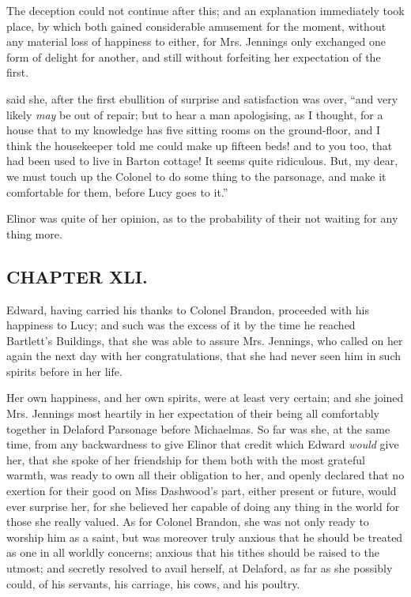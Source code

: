 The deception could not continue after this; and an explanation immediately took place, by which both gained considerable amusement for the moment, without any material loss of happiness to either, for Mrs. Jennings only exchanged one form of delight for another, and still without forfeiting her expectation of the first.

 said she, after the first ebullition of surprise and satisfaction was over, “and very likely {\em may} be out of repair; but to hear a man apologising, as I thought, for a house that to my knowledge has five sitting rooms on the ground-floor, and I think the housekeeper told me could make up fifteen beds! and to you too, that had been used to live in Barton cottage! It seems quite ridiculous. But, my dear, we must touch up the Colonel to do some thing to the parsonage, and make it comfortable for them, before Lucy goes to it.”



Elinor was quite of her opinion, as to the probability of their not waiting for any thing more.

\subsection[chapter-xli.]{\useURL[url41][][][]\from[url41]CHAPTER XLI.}

Edward, having carried his thanks to Colonel Brandon, proceeded with his happiness to Lucy; and such was the excess of it by the time he reached Bartlett's Buildings, that she was able to assure Mrs. Jennings, who called on her again the next day with her congratulations, that she had never seen him in such spirits before in her life.

Her own happiness, and her own spirits, were at least very certain; and she joined Mrs. Jennings most heartily in her expectation of their being all comfortably together in Delaford Parsonage before Michaelmas. So far was she, at the same time, from any backwardness to give Elinor that credit which Edward {\em would} give her, that she spoke of her friendship for them both with the most grateful warmth, was ready to own all their obligation to her, and openly declared that no exertion for their good on Miss Dashwood's part, either present or future, would ever surprise her, for she believed her capable of doing any thing in the world for those she really valued. As for Colonel Brandon, she was not only ready to worship him as a saint, but was moreover truly anxious that he should be treated as one in all worldly concerns; anxious that his tithes should be raised to the utmost; and secretly resolved to avail herself, at Delaford, as far as she possibly could, of his servants, his carriage, his cows, and his poultry.

